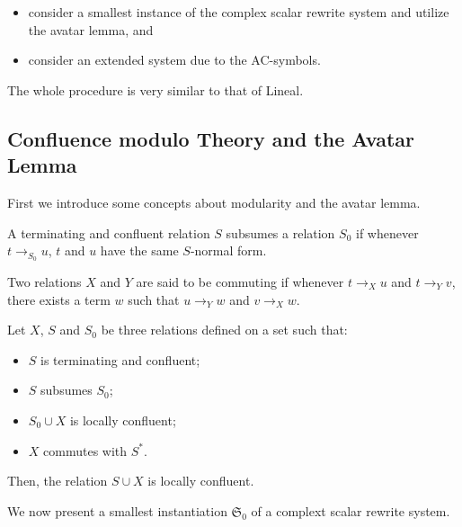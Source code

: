 \begin{itemize}
  \item consider a smallest instance of the complex scalar rewrite system and utilize the avatar lemma, and
  \item consider an extended system due to the AC-symbols.
\end{itemize}

The whole procedure is very similar to that of Lineal.

\subsection{Confluence modulo Theory and the Avatar Lemma}

First we introduce some concepts about modularity and the avatar lemma.

\begin{definition}[Subsumption]
  A terminating and confluent relation $S$ subsumes a relation $S_0$ if whenever $t \to_{S_0} u$, $t$ and $u$ have the same $S$-normal form.
\end{definition}

\begin{definition}
  Two relations $X$ and $Y$ are said to be commuting if whenever $t \to_X u$ and $t \to_Y v$, there exists a term $w$ such that $u \to_Y w$ and $v \to_X w$.
\end{definition}

\begin{proposition} \cite{Arrighi2005} Let $X$, $S$ and $S_0$ be three relations defined on a set such that:
  \begin{itemize}
    \item $S$ is terminating and confluent;
    \item $S$ subsumes $S_0$;
    \item $S_0 \cup X$ is locally confluent;
    \item $X$ commutes with $S^*$.
  \end{itemize}
  Then, the relation $S \cup X$ is locally confluent.
\end{proposition}

We now present a smallest instantiation $\mathfrak{S}_0$ of a complext scalar rewrite system. 

